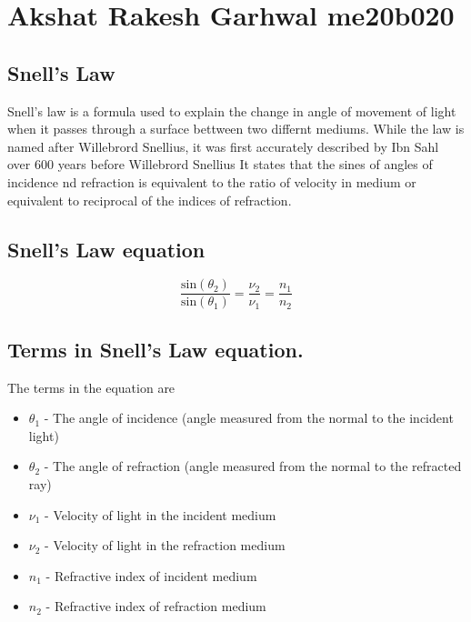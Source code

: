 \section{Akshat Rakesh Garhwal me20b020}
\subsection{Snell's Law}
Snell's law is a formula used to explain the change in angle of movement of light when it passes through a surface bettween two differnt mediums.
While the law is named after Willebrord Snellius, it was first accurately described by Ibn Sahl over 600 years before Willebrord Snellius
It states that the sines of angles of incidence nd refraction is equivalent to the ratio of velocity in medium or equivalent to reciprocal of the indices of refraction.
\subsection{Snell's Law equation}
\begin{equation}
	\frac {\text{sin}(\theta_{2})}{\text{sin}(\theta_{1})}  = \frac {\nu_{2}}{\nu_{1}} = {\frac  {n_{1}}{n_{2}}}
\end{equation}
\subsection{Terms in Snell's Law equation.}
The terms in the equation are 
\begin{itemize}
\item $\theta_{1}$ - The angle of incidence (angle measured from the normal to the incident light) 
\item $\theta_{2}$ - The angle of refraction (angle measured from the normal to the refracted ray)
\item $\nu_{1}$ - Velocity of light in the incident medium
\item $\nu_{2}$ - Velocity of light in the refraction medium
\item $n_{1}$ - Refractive index of incident medium
\item $n_{2}$ - Refractive index of refraction medium
\end{itemize}
